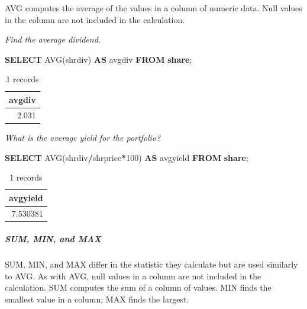 \documentclass[
]{article}
\newenvironment{Shaded}{\begin{snugshade}}{\end{snugshade}}
\newcommand{\DecValTok}[1]{\textcolor[rgb]{0.00,0.00,0.81}{#1}}
\newcommand{\FunctionTok}[1]{\textcolor[rgb]{0.00,0.00,0.00}{#1}}
\newcommand{\KeywordTok}[1]{\textcolor[rgb]{0.13,0.29,0.53}{\textbf{#1}}}
\newcommand{\NormalTok}[1]{#1}
\newcommand{\OperatorTok}[1]{\textcolor[rgb]{0.81,0.36,0.00}{\textbf{#1}}}
\begin{document}
AVG computes the average of the values in a column of numeric data. Null values in the column are not included in the calculation.

\emph{Find the average dividend.}

\begin{Shaded}
\begin{Highlighting}[]
\KeywordTok{SELECT} \FunctionTok{AVG}\NormalTok{(shrdiv) }\KeywordTok{AS}\NormalTok{ avgdiv }\KeywordTok{FROM} \KeywordTok{share}\NormalTok{;}
\end{Highlighting}
\end{Shaded}

\begin{table}

\caption{\label{tab:unnamed-chunk-23}1 records}
\centering
\begin{tabular}[t]{r}
\hline
avgdiv\\
\hline
2.031\\
\hline
\end{tabular}
\end{table}

\emph{What is the average yield for the portfolio?}

\begin{Shaded}
\begin{Highlighting}[]
\KeywordTok{SELECT} \FunctionTok{AVG}\NormalTok{(shrdiv}\OperatorTok{/}\NormalTok{shrprice}\OperatorTok{*}\DecValTok{100}\NormalTok{) }\KeywordTok{AS}\NormalTok{ avgyield }\KeywordTok{FROM} \KeywordTok{share}\NormalTok{;}
\end{Highlighting}
\end{Shaded}

\begin{table}

\caption{\label{tab:unnamed-chunk-24}1 records}
\centering
\begin{tabular}[t]{r}
\hline
avgyield\\
\hline
7.530381\\
\hline
\end{tabular}
\end{table}

\hypertarget{sum-min-and-max}{%
\subparagraph*{SUM, MIN, and MAX}\label{sum-min-and-max}}

SUM, MIN, and MAX differ in the statistic they calculate but are used similarly to AVG. As with AVG, null values in a column are not included in the calculation. SUM computes the sum of a column of values. MIN finds the smallest value in a column; MAX finds the largest.
\end{document}
